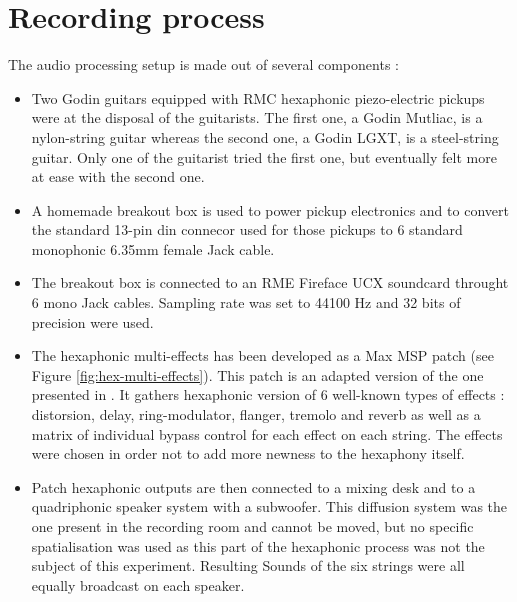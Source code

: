 \documentclass{article}
\begin{document}
\section{Recording process}
The audio processing setup is made out of several components : 
\begin{itemize}
    \item Two Godin guitars equipped with RMC hexaphonic piezo-electric pickups were at the disposal of the guitarists. 
    The first one, a Godin Mutliac, is a nylon-string guitar whereas the second one, a Godin LGXT, is a steel-string 
    guitar. Only one of the guitarist tried the first one, but eventually felt more at ease with the second one.
    \item A homemade breakout box is used to power pickup electronics and to convert the standard 13-pin din connecor 
    used for those pickups to 6 standard monophonic 6.35mm female Jack cable. 
    \item The breakout box is connected to an RME Fireface UCX soundcard throught 6 mono Jack cables. Sampling rate was 
    set to 44100 Hz and 32 bits of precision were used. 
    \item The hexaphonic multi-effects has been developed as a Max MSP patch (see Figure \ref{fig:hex-multi-effects}). This patch is an adapted version of the 
    one presented in \cite{Reboursiere2020_Puzzle_eng}. It gathers hexaphonic version of 6 well-known types of effects : 
    distorsion, delay, ring-modulator, flanger, tremolo and reverb as well as a matrix of individual bypass 
    control for each effect on each string. The effects were chosen in order not to add more newness to the hexaphony 
    itself. 
    \item Patch hexaphonic outputs are then connected to a mixing desk and to a quadriphonic speaker system with a 
    subwoofer. This diffusion system was the one present in the recording room and cannot be moved, but no specific
    spatialisation was used as this part of the hexaphonic process was not the subject of this experiment. Resulting Sounds 
    of the six strings were all equally broadcast on each speaker.
\end{itemize}
\end{document}
